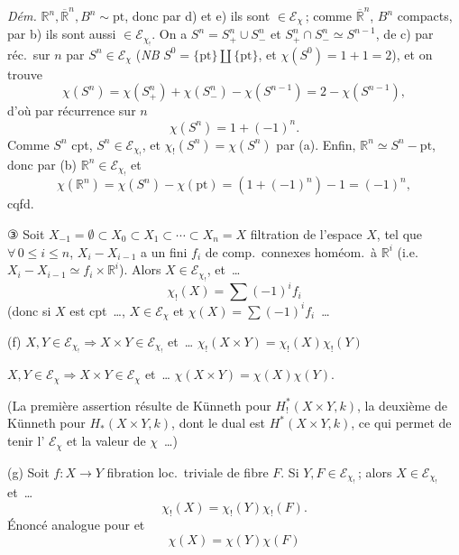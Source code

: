 \documentclass[11pt,a4paper]{article}
\begin{document}
\emph{Dém.} $\mathbb{R}^n, \overline{\mathbb{R}}^n, B^n \sim \mathrm{pt}$, donc par d) et e) ils sont $\in \mathcal{E}_{\chi}$\,; comme $\overline{\mathbb{R}}^n$, $B^n$ compacts, par b) ils sont aussi $\in \mathcal{E}_{\chi_!}$. On a $S^n = S^n_+ \cup S^n_-$ et $S^n_+ \cap S^n_- \simeq S^{n-1}$,  de c) par réc.\ sur $n$ par $S^n \in \mathcal{E}_{\chi}$ (\emph{NB} $S^0 = \{\mathrm{pt}\} \amalg \{\mathrm{pt}\}$, et $\chi(S^0) = 1 + 1 = 2$), et on trouve
\[
  \chi(S^n) = \chi(S^n_+) + \chi(S^n_-) - \chi(S^{n-1}) = 2 - \chi(S^{n-1}) ,
\]
d'où par récurrence sur $n$
\[
  \chi(S^n) = 1 + (-1)^n .
\]
Comme $S^n$ cpt, $S^n \in \mathcal{E}_{\chi_!}$, et $\chi_!(S^n) = \chi(S^n)$ par (a). Enfin, $\mathbb{R}^n \simeq S^n - \mathrm{pt}$, donc par (b) $\mathbb{R}^n \in \mathcal{E}_{\chi_!}$ et
\[
  \chi(\mathbb{R}^n) = \chi(S^n) - \chi(\mathrm{pt}) = (1 + (-1)^n) - 1 = (-1)^n ,
\]
cqfd.

③ Soit $X_{-1} = \emptyset \subset X_0 \subset X_1 \subset \cdots \subset X_n = X$ filtration de l'espace $X$, tel que $\forall\, 0 \leq i \leq n$, $X_i - X_{i-1}$ \struck{\ill{}} a un  fini $f_i$ de comp.\ connexes  homéom.\ à $\mathbb{R}^i$ (i.e.\ $X_i - X_{i-1} \simeq f_i \times \mathbb{R}^i$). Alors $X \in \mathcal{E}_{\chi_!}$, et~…
\[
  \chi_!(X) = \sum (-1)^i f_i
\]
(donc si $X$ est cpt~…, $X \in \mathcal{E}_{\chi}$ et $\chi(X) = \sum (-1)^i f_i$~…


(f) $X, Y \in \mathcal{E}_{\chi_!} \Longrightarrow X \times Y \in \mathcal{E}_{\chi_!}$ et~… \quad $\chi_!(X \times Y) = \chi_!(X)\chi_!(Y)$

$X, Y \in \mathcal{E}_{\chi} \Longrightarrow X \times Y \in \mathcal{E}_{\chi}$ et~… \quad $\chi(X \times Y) = \chi(X)\chi(Y)$.

(La première assertion résulte de Künneth pour $H^*_!(X \times Y, k)$, la deuxième de Künneth pour $H_*(X \times Y, k)$, dont le dual est $H^*(X \times Y, k)$, ce qui permet de tenir l'  $\mathcal{E}_{\chi}$ et la valeur de $\chi$~…)

(g) Soit $f : X \to Y$ fibration loc.\ triviale de fibre $F$. Si $Y, F \in \mathcal{E}_{\chi_!}$\,; alors $X \in \mathcal{E}_{\chi_!}$ et~…
\[
  \chi_!(X) = \chi_!(Y)\chi_!(F) .
\]
Énoncé analogue pour   et 
\[
  \chi(X) = \chi(Y)\chi(F)
\]
\end{document}
